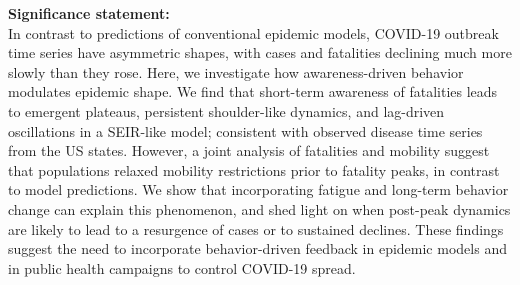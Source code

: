 \begin{boxit}
\noindent
\textbf{Significance statement:}\\
In contrast to predictions of conventional epidemic models, COVID-19 outbreak time series have asymmetric shapes, with cases and fatalities declining much more slowly than they rose. 
Here, we investigate how awareness-driven behavior modulates epidemic shape. 
We find that short-term awareness of fatalities leads to emergent plateaus, persistent shoulder-like dynamics, and lag-driven oscillations in a SEIR-like model; consistent with observed disease time series from the US states. 
However, a joint analysis of fatalities and mobility suggest that populations relaxed mobility restrictions prior to fatality peaks, in contrast to model predictions. 
We show that incorporating fatigue and long-term behavior change can explain this phenomenon, and shed light on when post-peak dynamics are likely to lead to a resurgence of cases or to  sustained declines. These findings suggest the need to incorporate behavior-driven feedback in epidemic models and in public health campaigns to control COVID-19 spread.
\end{boxit}
